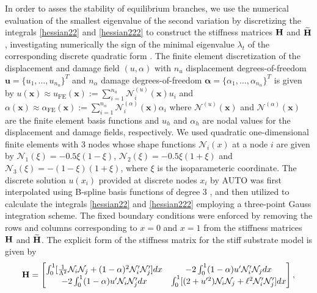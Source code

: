 \documentclass[10pt]{article}
\begin{document}
In order to asses the stability of equilibrium branches, we use  the numerical evaluation of the smallest eigenvalue of the second variation by discretizing the integrals \eqref{hessian22} and   \eqref{hessian222} to construct the stiffness matrices
$\mathbf{H}$ and $\widetilde{\mathbf{H}}$, investigating numerically the sign of the minimal eigenvalue $\lambda_t$ of the corresponding discrete quadratic form \cite{Sanderson2016-ht}.  The finite element discretization of the displacement and damage field $(u, \alpha )$     with \( n_u \) displacement degrees-of-freedom 
$
\mathbf{u} = \{ u_1, \ldots, u_{n_u} \}^T 
$
and \( n_\alpha \) damage degrees-of-freedom 
$
\boldsymbol{\alpha} = \{ \alpha_1, \ldots, \alpha_{n_\alpha} \}^T
$ is given by 
$
u(\mathbf{x}) \approx u_{\text{FE}} (\mathbf{x}) := \sum_{i=1}^{n_u} \mathcal{N}^{(u)}_i(\mathbf{x}) u_i $
and $\alpha(\mathbf{x}) \approx \alpha_{\text{FE}} (\mathbf{x}) := \sum_{i=1}^{n_\alpha} \mathcal{N}^{(\alpha)}_i (\mathbf{x}) \alpha_i 
$
where $\mathcal{N}^{(u)}(\mathbf{x}) $ and $\mathcal{N}^{(\alpha)}(\mathbf{x}) $ are the finite element basis functions and  $u_h$ and  $\alpha_h$ are nodal values for the displacement and damage fields, respectively. We used quadratic one-dimensional finite elements with 3 nodes  whose   shape functions   ${\mathcal N}_i(x)$ at a node $i$  are given by ${\mathcal N}_1(\xi)=-0.5\xi(1-\xi)$, ${\mathcal N}_2(\xi)=-0.5\xi(1+\xi)$ and ${\mathcal N}_3(\xi)=-(1-\xi)(1+\xi)$, where $\xi$ is the isoparameteric coordinate. The discrete solution $u(x_i)$ provided at discrete nodes $x_i$ by AUTO was first interpolated using B-spline basis functions of degree 3 \cite{Grimstad2016-cq}, and then utilized to calculate the integrals \eqref{hessian22} and \ref{hessian222} employing a three-point Gauss integration scheme. The fixed boundary conditions were enforced by removing the rows and columns corresponding to $x = 0$ and $x = 1$ from the stiffness matrices 
%
$\mathbf{H}$ and $\widetilde{\mathbf{H}}$. The explicit form of the stiffness matrix for the stiff substrate model is given by
\begin{equation}
    \stiffmat = 
    \begin{bmatrix}
\int_0^1[ \frac{1}{\Lambda^2}{\mathcal N}_i{\mathcal N}_j + (1-\alpha)^2{\mathcal N}'_i{\mathcal N}'_j
%
] dx&
-2\int_0^1(1-\alpha)u' {\mathcal N}'_i {\mathcal N}_j  dx\\
-2\int_0^1(1-\alpha)u' {\mathcal N}_i {\mathcal N}'_j dx
& \int_0^1 [ (2+u'^2){\mathcal N}_i{\mathcal N}_j +\damagell^2{\mathcal N}'_i{\mathcal N}'_j] dx
\end{bmatrix},
\label{eq:stifness1}
\end{equation}
\end{document}
